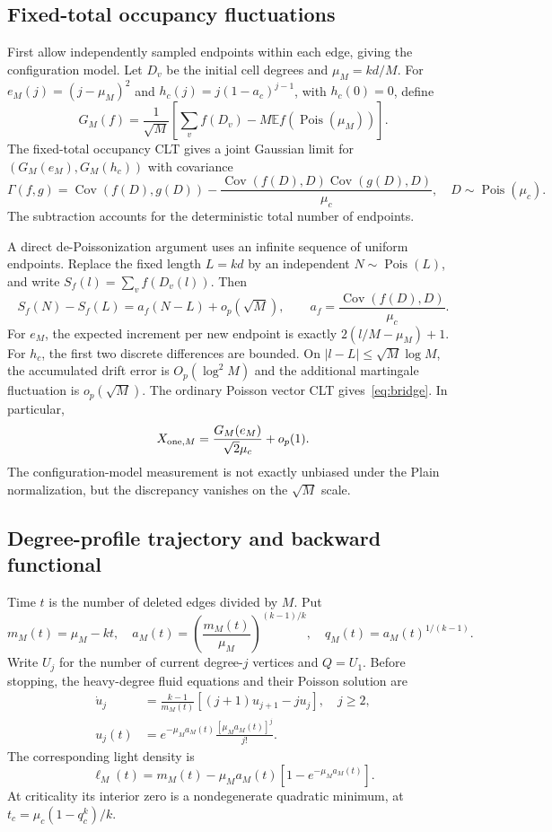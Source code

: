 \documentclass[11pt,a4paper]{article}
\newcommand{\E}{\mathbb E}
\newcommand{\Cov}{\operatorname{Cov}}
\newcommand{\Pois}{\operatorname{Pois}}
\begin{document}
\subsection{Fixed-total occupancy fluctuations}
First allow independently sampled endpoints within each edge, giving the configuration model. Let $D_v$ be the initial cell degrees and $\mu_M=kd/M$. For
$e_M(j)=(j-\mu_M)^2$ and $h_c(j)=j(1-a_c)^{j-1}$, with $h_c(0)=0$, define
\begin{equation}
G_M(f)=\frac1{\sqrt M}\left[\sum_vf(D_v)-M\E f(\Pois(\mu_M))\right].
\end{equation}
The fixed-total occupancy CLT gives a joint Gaussian limit for
$(G_M(e_M),G_M(h_c))$ with covariance
\begin{equation}
\Gamma(f,g)=\Cov(f(D),g(D))-
\frac{\Cov(f(D),D)\Cov(g(D),D)}{\mu_c},\quad D\sim\Pois(\mu_c).\label{eq:bridge}
\end{equation}
The subtraction accounts for the deterministic total number of endpoints.

A direct de-Poissonization argument uses an infinite sequence of uniform endpoints. Replace the fixed length $L=kd$ by an independent $N\sim\Pois(L)$, and write $S_f(l)=\sum_v f(D_v(l))$. Then
\begin{equation}
S_f(N)-S_f(L)=a_f(N-L)+o_p(\sqrt M),\qquad
a_f=\frac{\Cov(f(D),D)}{\mu_c}.
\end{equation}
For $e_M$, the expected increment per new endpoint is exactly $2(l/M-\mu_M)+1$. For $h_c$, the first two discrete differences are bounded. On
$|l-L|\le\sqrt M\log M$, the accumulated drift error is $O_p(\log^2M)$ and the additional martingale fluctuation is $o_p(\sqrt M)$. The ordinary Poisson vector CLT gives~\eqref{eq:bridge}. In particular,
\begin{equation}
X_{{\rm one},M}=\frac{G_M(e_M)}{\sqrt2\mu_c}+o_p(1).
\end{equation}
The configuration-model measurement is not exactly unbiased under the Plain normalization, but the discrepancy vanishes on the $\sqrt M$ scale.

\subsection{Degree-profile trajectory and backward functional}
Time $t$ is the number of deleted edges divided by $M$. Put
\begin{equation}
m_M(t)=\mu_M-kt,\quad a_M(t)=\left(\frac{m_M(t)}{\mu_M}\right)^{(k-1)/k},\quad
q_M(t)=a_M(t)^{1/(k-1)}.
\end{equation}
Write $U_j$ for the number of current degree-$j$ vertices and $Q=U_1$. Before stopping, the heavy-degree fluid equations and their Poisson solution are
\begin{align}
\dot u_j&=\frac{k-1}{m_M(t)}[(j+1)u_{j+1}-ju_j],\quad j\ge2,\\
u_j(t)&=e^{-\mu_Ma_M(t)}\frac{[\mu_Ma_M(t)]^j}{j!}.
\end{align}
The corresponding light density is
\begin{equation}
\ell_M(t)=m_M(t)-\mu_Ma_M(t)[1-e^{-\mu_Ma_M(t)}].
\end{equation}
At criticality its interior zero is a nondegenerate quadratic minimum, at
$t_c=\mu_c(1-q_c^k)/k$.
\end{document}

